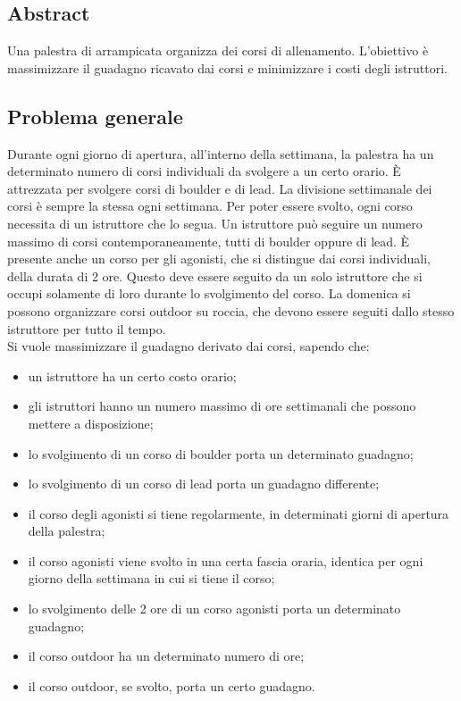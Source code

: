 \subsection{Abstract}
Una palestra di arrampicata organizza dei corsi di allenamento. L'obiettivo è massimizzare il guadagno ricavato dai corsi e minimizzare i costi degli istruttori.

\subsection{Problema generale}
Durante ogni giorno di apertura, all'interno della settimana, la palestra ha un determinato numero di corsi individuali da svolgere a un certo orario. È attrezzata per svolgere corsi di boulder e di lead. La divisione settimanale dei corsi è sempre la stessa ogni settimana. Per poter essere svolto, ogni corso necessita di un istruttore che lo segua. Un istruttore può seguire un numero massimo di corsi contemporaneamente, tutti di boulder oppure di lead. È presente anche un corso per gli agonisti, che si distingue dai corsi individuali, della durata di 2 ore. Questo deve essere seguito da un solo istruttore che si occupi solamente di loro durante lo svolgimento del corso. La domenica si possono organizzare corsi outdoor su roccia, che devono essere seguiti dallo stesso istruttore per tutto il tempo. \\
Si vuole massimizzare il guadagno derivato dai corsi, sapendo che:
\begin{itemize}
	\item un istruttore ha un certo costo orario;
	\item gli istruttori hanno un numero massimo di ore settimanali che possono mettere a disposizione;
	\item lo svolgimento di un corso di boulder porta un determinato guadagno;
	\item lo svolgimento di un corso di lead porta un guadagno differente;
	\item il corso degli agonisti si tiene regolarmente, in determinati giorni di apertura della palestra;
	\item il corso agonisti viene svolto in una certa fascia oraria, identica per ogni giorno della settimana in cui si tiene il corso;
	\item lo svolgimento delle 2 ore di un corso agonisti porta un determinato guadagno;
	\item il corso outdoor ha un determinato numero di ore;
	\item il corso outdoor, se svolto, porta un certo guadagno.
\end{itemize}
